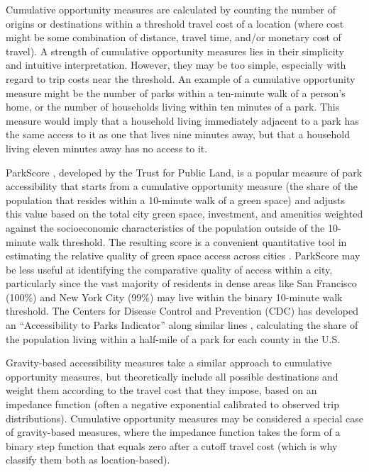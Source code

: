 \documentclass[3p, authoryear]{elsarticle} %
\begin{document}
Cumulative opportunity measures are calculated by counting the number of origins
or destinations within a threshold travel cost of a location (where cost might
be some combination of distance, travel time, and/or monetary cost of travel). A
strength of cumulative opportunity measures lies in their simplicity and
intuitive interpretation. However, they may be too simple, especially with
regard to trip costs near the threshold. An example of a cumulative opportunity
measure might be the number of parks within a ten-minute walk of a person's
home, or the number of households living within ten minutes of a park. This
measure would imply that a household living immediately adjacent to a park has
the same access to it as one that lives nine minutes away, but that a household
living eleven minutes away has no access to it.

ParkScore \citep{parkscore2019}, developed by the Trust for Public Land, is a popular
measure of park accessibility that starts from a cumulative opportunity measure
(the share of the population that resides within a 10-minute walk of a green
space) and adjusts this value based on the total city green space, investment,
and amenities weighted against the socioeconomic characteristics of the
population outside of the 10-minute walk threshold. The resulting score is a
convenient quantitative tool in estimating the relative quality of green space
access across cities \citep{Rigolon2018}. ParkScore may be less useful at identifying the
comparative quality of access within a city, particularly since the vast majority
of residents in dense areas like San Francisco (100\%) and New York City (99\%)
may live within the binary 10-minute walk threshold. The Centers
for Disease Control and Prevention (CDC) has developed an ``Accessibility to
Parks Indicator'' along similar lines \citep{Ussery2016}, calculating the share of the
population living within a half-mile of a park for each county in the U.S.

Gravity-based accessibility measures take a similar approach to cumulative
opportunity measures, but theoretically include all possible destinations and
weight them according to the travel cost that they impose, based on an impedance
function (often a negative exponential calibrated to observed trip distributions).
Cumulative opportunity measures may be considered a special case of
gravity-based measures, where the impedance function takes the form of a binary
step function that equals zero after a cutoff travel cost (which is why
\citet{GEURS2004127} classify them both as location-based).
\end{document}
